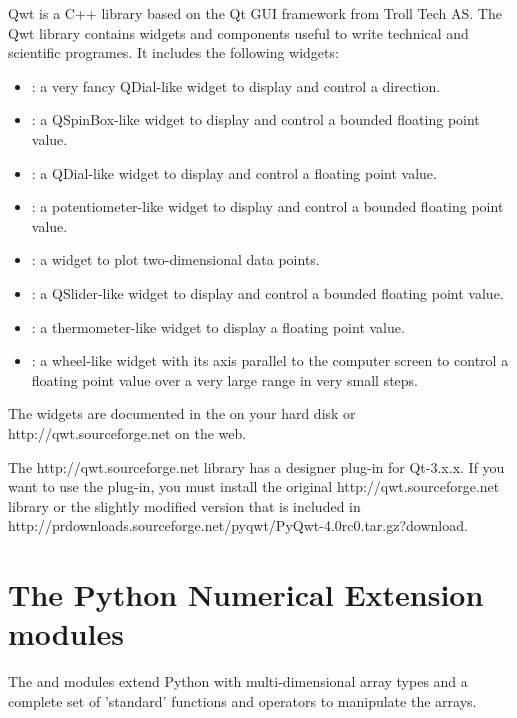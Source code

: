 \documentclass{manual}
\newcommand{\Qwt}{\ulink{Qwt}
  {http://qwt.sourceforge.net}}
\newcommand{\PyQwtTarGz}{\ulink{PyQwt-4.0rc0.tar.gz}
  {http://prdownloads.sourceforge.net/pyqwt/PyQwt-4.0rc0.tar.gz?download}}
\begin{document}
Qwt is a C++ library based on the Qt GUI framework from Troll Tech AS.
The Qwt library contains widgets and components useful to write technical
and scientific programes.
It includes the following widgets:
\begin{itemize}
  \item
    : a very fancy QDial-like widget to display and
    control a direction.
  \item
    : a QSpinBox-like widget to display and control
    a bounded floating point value.
  \item
    : a QDial-like widget to display and control a
    floating point value.
  \item
    : a potentiometer-like widget to display and control
    a bounded floating point value.
  \item
    : a widget to plot two-dimensional data points.
  \item
    : a QSlider-like widget to display and control a
    bounded floating point value.
  \item
    : a thermometer-like widget to display a floating
    point value. 
  \item
    : a wheel-like widget with its axis parallel to
    the computer screen to control a floating point value over a very
    large range in very small steps.
\end{itemize}
The widgets are documented in the
on your hard disk or \Qwt{} on the web.

\begin{notice}[note]
  The \Qwt{} library has a designer plug-in for Qt-3.x.x.  If you want to use
  the plug-in, you must install the original \Qwt{} library or the slightly
  modified version that is included in \PyQwtTarGz{}.
\end{notice}


\section{The Python Numerical Extension modules \label{numeric-intro}}

The 
and 
modules extend Python with multi-dimensional array types and a complete
set of 'standard' functions and operators to manipulate the arrays.
\end{document}

